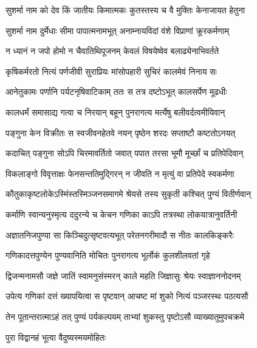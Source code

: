 \twolineshloka
{सुशर्मा नाम को देव किं जातीयः किमात्मकः}
{कुतस्तस्य च वै मुक्तिः केनाजायत हेतुना} %


\twolineshloka
{सुशर्मा नाम दुर्मेधाः सीमा पापात्मनामभूत्}
{अनाम्नायविदां वंशे विप्राणां क्रूरकर्मणाम्} %

\twolineshloka
{न ध्यानं न जपो होमो न चैवातिथिपूजनम्}
{केवलं विषयेष्वेव बलाढ्येनाभिवर्तते} %

\twolineshloka
{कृषिकर्मरतो नित्यं पर्णजीवी सुराप्रियः}
{मांसोपहारी सुचिरं कालमेवं निनाय सः} %

\twolineshloka
{आनेतुकामः पर्णानि पर्यटनृषिवाटिकाम्}
{ततः स तत्र दष्टोऽभूत् कालसर्पेण मूढधीः} %

\twolineshloka
{कालधर्मं समासाद्य गत्वा च निरयान् बहून्}
{पुनरागत्य मर्त्येषु बलीवर्दत्वमीयिवान्} %

\twolineshloka
{पङ्गुना केन विक्रीतः स स्वजीवनहेतवे}
{नयन् पृष्ठेन शरदः सप्ताष्टौ कष्टतोऽनयत्} %

\twolineshloka
{कदाचित् पङ्गुना सोऽपि चिरमावर्तितो जवात्}
{पपात तरसा भूमौ मूर्च्छां च प्रतिपेदिवान्} %

\twolineshloka
{विकलाङ्गो विवृत्ताक्षः फेनसन्ततिमुद्गिरन्}
{न जीवति न मृत्युं वा प्रतिपेदे स्वकर्मणा} %

\twolineshloka
{कौतुकाकृष्टलोकेऽस्मिंस्तस्मिञ्जनसमागमे}
{श्रेयसे तस्य सुकृती कश्चित् पुण्यं वितीर्णवान्} %

\twolineshloka
{कर्माणि स्वान्यनुस्मृत्य ददुरन्ये च केचन}
{गणिका काऽपि तत्रस्था लोकयात्रानुवर्तिनी} %

\twolineshloka
{अज्ञातनिजपुण्या सा किञ्चिदुत्सृष्टवत्यभूत्}
{परेतनगरीमादौ स नीतः कालकिङ्करैः} %

\twolineshloka
{गणिकादत्तपुण्येन पुण्यवानिति मोचितः}
{पुनरागत्य भूर्लोकं कुलशीलवतां गृहे} %

\twolineshloka
{द्विजन्मनामसौ जज्ञे जातिं स्वामनुसंस्मरन्}
{काले महति जिज्ञासुः श्रेयः स्वाज्ञाननोदनम्} %

\twolineshloka
{उपेत्य गणिकां दत्तं ख्यापयित्वा स पृष्टवान्}
{आचष्ट मां शुको नित्यं पञ्जरस्थः पठत्यसौ} %

\twolineshloka
{तेन पूतान्तरात्माऽहं तत् पुण्यं पर्यकल्पयम्}
{ताभ्यां शुकस्तु पृष्टोऽसौ व्याख्यातुमुपचक्रमे} %



\onelineshloka
{पुरा विद्वानहं भूत्वा वैदुष्यस्मयमोहितः} %

